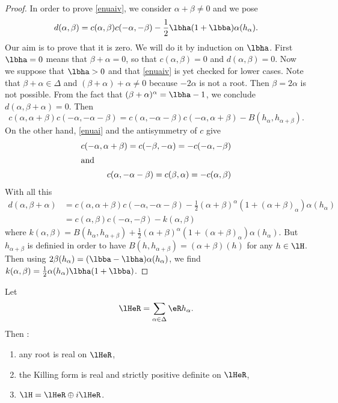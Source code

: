 \begin{proof}
In order to prove \ref{enuaiv}, we consider $\alpha+\beta\neq0$ and we pose
\[
d(\alpha,\beta)=c(\alpha,\beta)c(-\alpha,-\beta)-\frac{1}{2}\lbha(1+\lbba)\alpha(h_{\alpha}).
\]
Our aim is to prove that it is zero. We will do it by induction on $\lbha$. First $\lbha=0$ means that $\beta+\alpha=0$, so that $c(\alpha,\beta)=0$ and $d(\alpha,\beta)=0$. Now we suppose that $\lbha>0$ and that \ref{enuaiv} is yet checked for lower cases. Note that $\beta+\alpha\in \Delta$ and $(\beta+\alpha)+\alpha\neq 0$ because $-2\alpha$ is not a root. Then $\beta=2\alpha$ is not possible. From the fact that $(\beta+\alpha)^{\alpha}=\lbha-1$, we conclude $d(\alpha,\beta+\alpha)=0$. Then
\[
c(\alpha,\alpha+\beta)c(-\alpha,-\alpha-\beta)=c(\alpha,-\alpha-\beta)c(-\alpha,\alpha+\beta)-B(h_{\alpha},h_{\alpha+\beta}).
\]
On the other hand, \ref{enuai} and the antisymmetry of $c$ give
\begin{subequations}
\begin{align}
c(-\alpha,\alpha+\beta)=c(-\beta,-\alpha)=-c(-\alpha,-\beta)\\
\intertext{and}
c(\alpha,-\alpha-\beta)=c(\beta,\alpha)=-c(\alpha,\beta)
\end{align}
\end{subequations}
With all this
\begin{equation}
\begin{split}
d(\alpha,\beta+\alpha)&=c(\alpha,\alpha+\beta)c(-\alpha,-\alpha-\beta)-\frac{1}{2}(\alpha+\beta)^{\alpha}(1+(\alpha+\beta)_{\alpha})\alpha(h_{\alpha})\\
&=c(\alpha,\beta)c(-\alpha,-\beta)-k(\alpha,\beta)
\end{split}
\end{equation}
where $k(\alpha,\beta)=B(h_{\alpha},h_{\alpha+\beta})+\frac{1}{2}(\alpha+\beta)^{\alpha}(1+(\alpha+\beta)_{\alpha})\alpha(h_{\alpha})$. But $h_{\alpha+\beta}$ is definied in order to have $B(h,h_{\alpha+\beta})=(\alpha+\beta)(h)$ for any $h\in\lH$. Then using $2\beta(h_{\alpha})=(\lbba-\lbha)\alpha(h_{\alpha})$, we find $k(\alpha,\beta)=\frac{1}{2}\alpha(h_{\alpha})\lbha(1+\lbba)$.
\end{proof}

\begin{proposition}\label{prop:lHeR}
Let 
\begin{equation}
\lHeR=\sum_{\alpha\in\Delta}\eR h_{\alpha}.
\end{equation}
Then :
\begin{enumerate}
    \item any root is real on $\lHeR$,
    \item the Killing form is real and strictly positive definite on $\lHeR$,
    \item $\lH=\lHeR\oplus i\lHeR$.
\end{enumerate}
\end{proposition}

